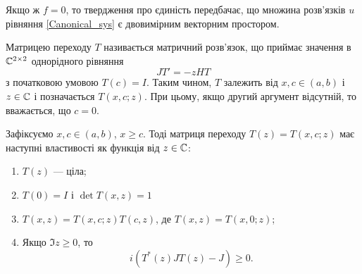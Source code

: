 Якщо ж $f=0$, то твердження про єдиність передбачає, що множина розв'язків $u$ рівняння \eqref{Canonical_sys} є двовимірним векторним простором.

Матрицею переходу $T$ називається матричний розв'язок, що приймає значення в $\mathbb{C}^{2\times 2}$ однорідного рівняння
\begin{equation}\label{eq-Canonycal_sys_matrix}
	JT'=-zHT
\end{equation}
з початковою умовою $T(c) = I$. Таким чином, $T$ залежить від $x,c \in (a, b)$ і $z \in\mathbb{C}$ і позначається $T(x,c;z)$. При цьому, якщо другий аргумент відсутній, то вважається, що $c=0$.

\begin{theorem}\label{th-CS-2}
	Зафіксуємо $x,c\in(a,b)$, $x\ge c$. Тоді матриця переходу $T(z) = T(x,c;z)$ має наступні властивості як функція від $z\in\mathbb{C}$:
	\begin{enumerate}
		\item $T(z)$ --- ціла; \label{i-1-th-2}
		\item $T(0) = I$  і $\det{T(x,z)} = 1$ \label{i-2-th-2}
		\item $T(x,z) = T(x,c;z)T(c,z)$, де $T(x,z) = T(x,0;z)$; \label{i-3-th-2}
		\item Якщо $\Im z\ge 0$, то \label{i-4-th-2}
		\begin{equation}\label{eq-1-th-2}
			i(T^*(z)JT(z)-J)\ge 0.
		\end{equation}
	\end{enumerate}
\end{theorem}
